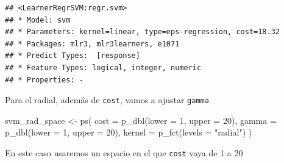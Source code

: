 \documentclass[
  11pt,
  a4paper,
]{article}
\newenvironment{Shaded}{\begin{snugshade}}{\end{snugshade}}
\newcommand{\AttributeTok}[1]{\textcolor[rgb]{0.77,0.63,0.00}{#1}}
\newcommand{\CommentTok}[1]{\textcolor[rgb]{0.56,0.35,0.01}{\textit{#1}}}
\newcommand{\ConstantTok}[1]{\textcolor[rgb]{0.00,0.00,0.00}{#1}}
\newcommand{\DecValTok}[1]{\textcolor[rgb]{0.00,0.00,0.81}{#1}}
\newcommand{\FunctionTok}[1]{\textcolor[rgb]{0.00,0.00,0.00}{#1}}
\newcommand{\NormalTok}[1]{#1}
\newcommand{\OtherTok}[1]{\textcolor[rgb]{0.56,0.35,0.01}{#1}}
\newcommand{\SpecialCharTok}[1]{\textcolor[rgb]{0.00,0.00,0.00}{#1}}
\newcommand{\StringTok}[1]{\textcolor[rgb]{0.31,0.60,0.02}{#1}}
\begin{document}
\begin{verbatim}
## <LearnerRegrSVM:regr.svm>
## * Model: svm
## * Parameters: kernel=linear, type=eps-regression, cost=18.32
## * Packages: mlr3, mlr3learners, e1071
## * Predict Types:  [response]
## * Feature Types: logical, integer, numeric
## * Properties: -
\end{verbatim}

Para el radial, además de \texttt{cost}, vamos a ajustar \texttt{gamma}

\begin{Shaded}
\begin{Highlighting}[]
\NormalTok{svm\_rad\_space }\OtherTok{\textless{}{-}} \FunctionTok{ps}\NormalTok{(}
  \AttributeTok{cost =} \FunctionTok{p\_dbl}\NormalTok{(}\AttributeTok{lower =} \DecValTok{1}\NormalTok{, }\AttributeTok{upper =} \DecValTok{20}\NormalTok{),}
  \AttributeTok{gamma =} \FunctionTok{p\_dbl}\NormalTok{(}\AttributeTok{lower =} \DecValTok{1}\NormalTok{, }\AttributeTok{upper =} \DecValTok{20}\NormalTok{),}
  \AttributeTok{kernel =} \FunctionTok{p\_fct}\NormalTok{(}\AttributeTok{levels =} \StringTok{"radial"}\NormalTok{)}
\NormalTok{)}
\end{Highlighting}
\end{Shaded}

En este caso usaremos un espacio en el que \texttt{cost} vaya de 1 a 20

\begin{Shaded}
\end{Shaded}
\end{document}

